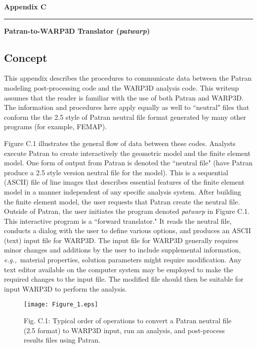 \documentclass[11pt]{report}
\numberwithin{equation}{section}
\newcommand{\eg}{\textit{e.g.,}}
\renewcommand\thesection{C}
\begin{document}
\LARGE
\hfill
\textbf{Appendix C}
\rule[0.15in]{450pt}{0.5mm}
\LARGE
\begin{flushright}
 \textbf{
{\selectfont Patran-to-WARP3D Translator (\textit{patwarp})}}
\end{flushright}
\normalsize


\subsection{Concept}
\noindent 
This appendix describes the procedures to communicate data between the Patran
modeling post-processing code and the WARP3D analysis code. This writeup assumes
that the reader is familiar with the use of both Patran and WARP3D. The information
and procedures here apply equally as well to ``neutral" files that 
conform the the 2.5 style of Patran neutral file format generated by many other 
programs (for example, FEMAP).

Figure C.1 illustrates the general flow of data between these codes. Analysts
execute Patran to create interactively the geometric model and the finite element model.
One form of output from Patran is denoted the ``neutral file" (have Patran
produce a 2.5 style version neutral file for the model). This is a sequential
(ASCII) file of line images that describes essential features of the finite
element model in a manner independent of any specific analysis system. After
building the finite element model, the user requests that Patran create the
neutral file. Outside of Patran, the user initiates the program denoted \textit{patwarp}
in Figure C.1. This interactive program is a ``forward translator." It reads the
neutral file, conducts a dialog with the user to define various options, and
produces an ASCII (text) input file for WARP3D. The input file for WARP3D generally requires
minor changes and additions by the user to include supplemental information, \eg\ material 
properties, solution parameters might require modification. Any text
editor available on the computer system may be employed to make the required
changes to the input file. The modified file should then be suitable for input
WARP3D to perform the analysis.
\begin{figure}[htb]
\begin{center}
\texttt{[image: Figure\_1.eps]} 
\caption*{\small 
Fig. \thesection.1: Typical order of operations to convert a Patran neutral file (2.5 format) to WARP3D input,
run an analysis, and post-process results files using Patran.\normalsize}
\label{F:cyclic-capabilities}
\end{center}
\end{figure}
\end{document}
